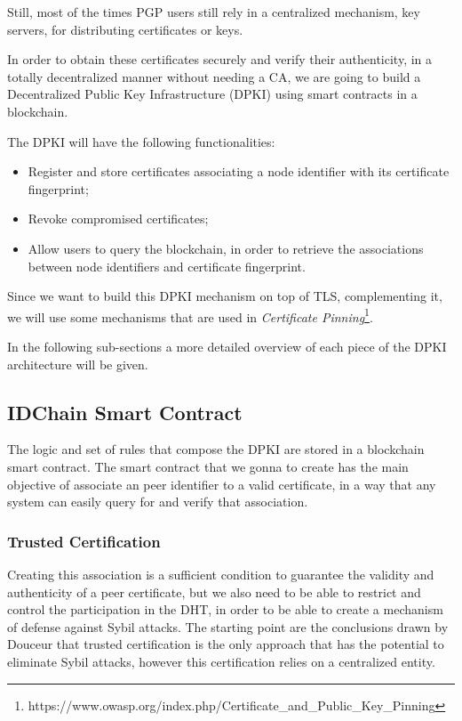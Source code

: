 Still, most of the times \ac{PGP} users still rely in a centralized mechanism, key servers, for distributing certificates or keys.

In order to obtain these certificates securely and verify their authenticity, in a totally decentralized manner without needing a CA, we are going to build a Decentralized Public Key Infrastructure (DPKI) using smart contracts in a blockchain.

The DPKI will have the following functionalities:
\begin{itemize}
	\item Register and store certificates associating a node identifier with its certificate fingerprint;
	\item Revoke compromised certificates;
	\item Allow users to query the blockchain, in order to retrieve the associations between node identifiers and certificate fingerprint.
\end{itemize}

Since we want to build this DPKI mechanism on top of TLS, complementing it, we will use some mechanisms that are used in \textit{Certificate Pinning}\footnote{https://www.owasp.org/index.php/Certificate\_and\_Public\_Key\_Pinning}.

In the following sub-sections a more detailed overview of each piece of the \ac{DPKI} architecture will be given.

\subsection{IDChain Smart Contract}

The logic and set of rules that compose the \ac{DPKI} are stored in a blockchain smart contract.
The smart contract that we gonna to create has the main objective of associate an peer identifier to a valid certificate, in a way that any system can easily query for and verify that association.

\subsubsection{Trusted Certification}
Creating this association is a sufficient condition to guarantee the validity and authenticity of a peer certificate, but we also need to be able to restrict and control the participation in the \ac{DHT}, in order to be able to create a mechanism of defense against Sybil attacks.
The starting point are the conclusions drawn by Douceur\cite{Douceur2002} that trusted certification is the only approach that has the potential to eliminate Sybil attacks, however this certification relies on a centralized entity.

